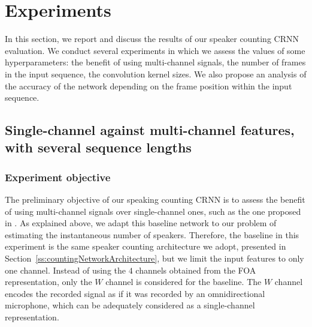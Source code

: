 \section{Experiments}

In this section, we report and discuss the results of our speaker counting CRNN evaluation. We conduct several experiments in which we assess the values of some hyperparameters: the benefit of using multi-channel signals, the number of frames in the input sequence, the convolution kernel sizes. We also propose an analysis of the accuracy of the network depending on the frame position within the input sequence.

\subsection{Single-channel against multi-channel features, with several sequence lengths}

\subsubsection{Experiment objective}

The preliminary objective of our speaking counting CRNN is to assess the benefit of using multi-channel signals over single-channel ones, such as the one proposed in \cite{stoter_countnet:_2019}. As explained above, we adapt this baseline network to our problem of estimating the instantaneous number of speakers. Therefore, the baseline in this experiment is the same speaker counting architecture we adopt, presented in Section~\ref{ss:countingNetworkArchitecture}, but we limit the input features to only one channel. Instead of using the $4$ channels obtained from the FOA representation, only the $W$ channel is considered for the baseline. The $W$ channel encodes the recorded signal as if it was recorded by an omnidirectional microphone, which can be adequately considered as a single-channel representation. 

